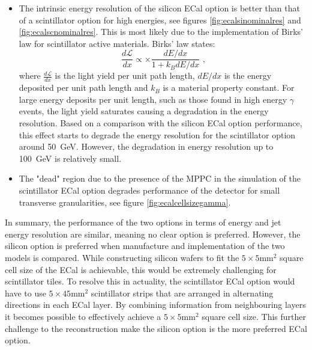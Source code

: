 \begin{itemize}
\item The intrinsic energy resolution of the silicon ECal option is better than that of a scintillator option for high energies, see figures \ref{fig:ecalsinominalres} and \ref{fig:ecalscnominalres}.  This is most likely due to the implementation of Birks' law \cite{BirksLaw} for scintillator active materials.  Birks' law states:
\begin{equation}
\frac{d\mathcal{L}}{dx} \propto \times \frac{dE/dx}{1+k_{B}dE/dx}\text{ ,}
\end{equation}
where $\frac{d\mathcal{L}}{dx}$ is the light yield per unit path length, $dE/dx$ is the energy deposited per unit path length and $k_{B}$ is a material property constant.  For large energy deposits per unit length, such as those found in high energy $\gamma$ events, the light yield saturates causing a degradation in the energy resolution.  Based on a comparison with the silicon ECal option performance, this effect starts to degrade the energy resolution for the scintillator option around 50~GeV.  However, the degradation in energy resolution up to 100~GeV is relatively small.
\item The "dead" region due to the presence of the MPPC in the simulation of the scintillator ECal option degrades performance of the detector for small transverse granularities, see figure \ref{fig:ecalcellsizegamma}.
\end{itemize}

In summary, the performance of the two options in terms of energy and jet energy resolution are similar, meaning no clear option is preferred.  However, the silicon option is preferred when manufacture and implementation of the two models is compared.  While constructing silicon wafers to fit the $5 \times 5 \text{mm}^{2}$ square cell size of the ECal is achievable, this would be extremely challenging for scintillator tiles.  To resolve this in actuality, the scintillator ECal option would have to use $5 \times 45 \text{mm}^{2}$ scintillator strips that are arranged in alternating directions in each ECal layer.  By combining information from neighbouring layers it becomes possible to effectively achieve a $5 \times 5 \text{mm}^{2}$ square cell size.  This further challenge to the reconstruction make the silicon option is the more preferred ECal option.  


